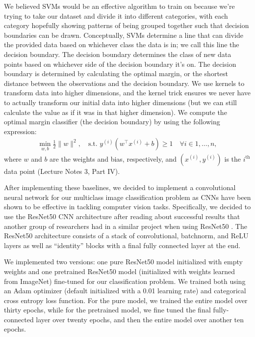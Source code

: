 \documentclass{article}
\begin{document}
We believed SVMs would be an effective algorithm to train on because we're trying to take our dataset and divide it into different categories, with each category hopefully showing patterns of being grouped together such that decision boundaries can be drawn. Conceptually, SVMs determine a line that can divide the provided data based on whichever class the data is in; we call this line the decision boundary. The decision boundary determines the class of new data points based on whichever side of the decision boundary it's on. The decision boundary is determined by calculating the optimal margin, or the shortest distance between the observations and the decision boundary. We use kernels to transform data into higher dimensions, and the kernel trick ensures we never have to actually transform our initial data into higher dimensions (but we can still calculate the value as if it was in that higher dimension). We compute the optimal margin classifier (the decision boundary) by using the following expression:
\begin{align*}
  \min_{w,b} \frac{1}{2}\|w\|^2, \quad \text{s.t. } y^{(i)}(w^\top x^{(i)} + b) \geq 1 \quad \forall i \in {1, \dots, n},
\end{align*}
where $w$ and $b$ are the weights and bias, respectively, and $(x^{(i)}, y^{(i)})$ is the $i^\text{th}$ data point (Lecture Notes 3, Part IV).

After implementing these baselines, we decided to implement a convolutional neural network for our multiclass image classification problem as CNNs have been shown to be effective in tackling computer vision tasks. Specifically, we decided to use the ResNet50 CNN architecture after reading about successful results that another group of researchers had in a similar project when using ResNet50 \cite{he2015deep}. The ResNet50 architecture consists of a stack of convolutional, batchnorm, and ReLU layers as well as “identity” blocks with a final fully connected layer at the end.

We implemented two versions: one pure ResNet50 model initialized with empty weights and one pretrained ResNet50 model (initialized with weights learned from ImageNet) fine-tuned for our classification problem. We trained both using an Adam optimizer (default initialized with a 0.01 learning rate) and categorical cross entropy loss function. For the pure model, we trained the entire model over thirty epochs, while for the pretrained model, we fine tuned the final fully-connected layer over twenty epochs, and then the entire model over another ten epochs.
\end{document}

